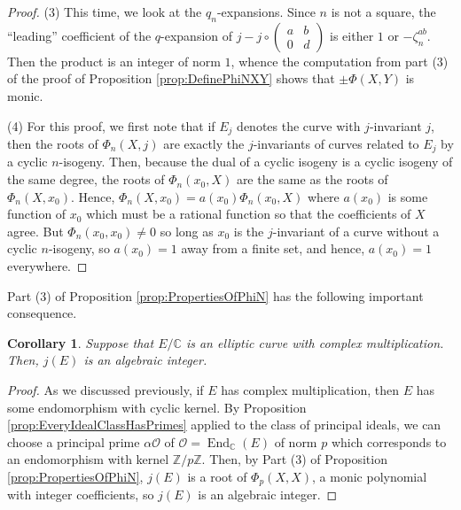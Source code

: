 \documentclass{amsart}
\newtheorem{cor}[thm]{Corollary}
\theoremstyle{definition}
\theoremstyle{remark}
\numberwithin{equation}{section}
\newcommand{\cO}{\mathcal O}
\newcommand{\bbC}{\mathbb C}
\newcommand{\bbZ}{\mathbb Z}
\newcommand{\twobytwo}[4]{\left(\begin{array}{cc} #1 & #2 \\ #3 & #4\end{array} \right)}
\DeclareMathOperator{\End}{End}
\begin{document}
\begin{proof}
(3) This time, we look at the $q_{n}$-expansions. Since $n$ is not a square, the ``leading'' coefficient of the $q$-expansion of $j - j \circ \twobytwo{a}{b}{0}{d}$ is either $1$ or $-\zeta_{n}^{ab}$. Then the product is an integer of norm $1$, whence the computation from part (3) of the proof of Proposition \ref{prop:DefinePhiNXY} shows that $\pm \Phi(X,Y)$ is monic.

(4) For this proof, we first note that if $E_{j}$ denotes the curve with $j$-invariant $j$, then the roots of $\Phi_{n}(X,j)$ are exactly the $j$-invariants of curves related to $E_{j}$ by a cyclic $n$-isogeny. Then, because the dual of a cyclic isogeny is a cyclic isogeny of the same degree, the roots of $\Phi_{n}(x_{0},X)$ are the same as the roots of $\Phi_{n}(X, x_{0})$. Hence, $\Phi_{n}(X, x_{0}) = a(x_{0}) \Phi_{n}(x_{0},X)$ where $a(x_{0})$ is some function of $x_{0}$ which must be a rational function so that the coefficients of $X$ agree. But $\Phi_{n}(x_{0}, x_{0}) \neq 0$ so long as $x_{0}$ is the $j$-invariant of a curve without a cyclic $n$-isogeny, so $a(x_{0}) = 1$ away from a finite set, and hence, $a(x_{0}) = 1$ everywhere.
\end{proof}

Part (3) of Proposition \ref{prop:PropertiesOfPhiN} has the following important consequence.

\begin{cor} \label{cor:jIsAlgebraicInt}
Suppose that $E/\bbC$ is an elliptic curve with complex multiplication. Then, $j(E)$ is an algebraic integer.
\end{cor}

\begin{proof}
As we discussed previously, if $E$ has complex multiplication, then $E$ has some endomorphism with cyclic kernel. By Proposition \ref{prop:EveryIdealClassHasPrimes} applied to the class of principal ideals, we can choose a principal prime $\alpha\cO$ of $\cO = \End_{\bbC}(E)$ of norm $p$ which corresponds to an endomorphism with kernel $\bbZ/p\bbZ$. Then, by Part (3) of Proposition \ref{prop:PropertiesOfPhiN}, $j(E)$ is a root of $\Phi_{p}(X,X)$, a monic polynomial with integer coefficients, so $j(E)$ is an algebraic integer. 
\end{proof}
\end{document}

